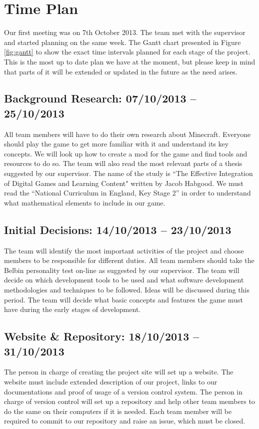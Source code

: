 \chapter{Time Plan}
Our first meeting was on 7th October 2013. The team met with the supervisor and started 
planning on the same week. The Gantt chart presented in Figure \ref{fig:gantt} to show the 
exact time intervals planned for each stage of the project. This is the most up to date
plan we have at the moment, but please keep in mind that parts of it will be extended 
or updated in the future as the need arises.

\section{Background Research: 07/10/2013 -- 25/10/2013}
All team members will have to do their own research about Minecraft. Everyone should play the game to get more familiar with it and understand its key concepts. We will look up how to create a mod for the game and find tools and resources to do so.
The team will also read the most relevant parts of a thesis suggested by our supervisor. The name of the study is “The Effective Integration of Digital Games and Learning Content" written by Jacob Habgood. 
We must read the ``National Curriculum in England, Key Stage 2'' in order to understand what mathematical elements to include in our game.

\section{Initial Decisions: 14/10/2013 -- 23/10/2013} 
The team will identify the most important activities of the project and choose members to be responsible for different duties. All team members should take the Belbin personality test on-line as suggested by our supervisor. The team will decide on which development tools to be used and what software development methodologies and techniques to be followed. Ideas will be discussed during this period. The team will decide what basic concepts and features the game must have during the early stages of development.

\section{Website \& Repository: 18/10/2013 -- 31/10/2013}
The person in charge of creating the project site will set up a website. The website must include extended description of our project, links to our documentations and proof of usage of a version control system.
The person in charge of version control will set up a repository and help other team members to do the same on their computers if it is needed. Each team member will be required to commit to our repository and raise an issue, which must be closed.

